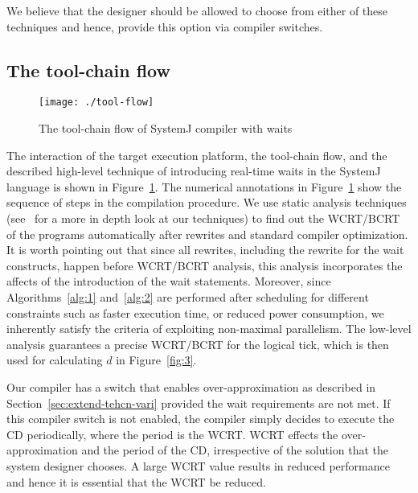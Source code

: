 We believe that the designer should be allowed to choose from either of
these techniques and hence, provide this option via compiler switches.

\subsection{The tool-chain flow}
\label{sec:tool-chain-flow}

\begin{figure}[t!]
  \centering
  \texttt{[image: ./tool-flow]}
  \caption{The tool-chain flow of SystemJ compiler with waits}
  \label{fig:4}
\end{figure}

The interaction of the target execution platform, the tool-chain flow,
and the described high-level technique of introducing real-time waits in
the SystemJ language is shown in Figure~\ref{fig:4}. The numerical
annotations in Figure~\ref{fig:4} show the sequence of steps in the
compilation procedure. We use static analysis techniques
(see~\cite{zli14} for a more in depth look at our techniques) to find
out the WCRT/BCRT of the programs automatically after rewrites and
standard compiler optimization.  It is worth pointing out that since all
rewrites, including the rewrite for the wait constructs, happen before
WCRT/BCRT analysis, this analysis incorporates the affects of the
introduction of the wait statements.  Moreover, since
Algorithms~\ref{alg:1} and~\ref{alg:2} are performed after scheduling
for different constraints such as faster execution time, or reduced
power consumption, we inherently satisfy the criteria of exploiting
non-maximal parallelism. The low-level analysis guarantees a precise
WCRT/BCRT for the logical tick, which is then used for calculating $d$
in Figure~\ref{fig:3}.

Our compiler has a switch that enables over-appro\-ximation as described
in Section~\ref{sec:extend-tehcn-vari} provided the wait requirements
are not met. If this compiler switch is not enabled, the compiler simply
decides to execute the CD periodically, where the period is the
WCRT. WCRT effects the over-approximation and the period of the CD,
irrespective of the solution that the system designer chooses. A large
WCRT value results in reduced performance and hence it is essential that
the WCRT be reduced.


